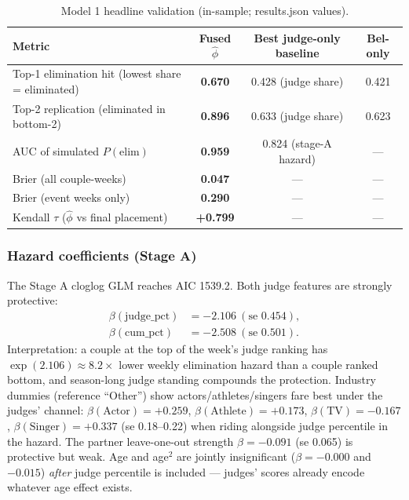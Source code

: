 \documentclass[10pt]{article}
\begin{document}
\begin{table}[H]
\centering
\caption{Model 1 headline validation (in-sample; results.json values).}
\label{tab:m1headline}
\begin{tabular}{lccc}
\toprule
Metric & Fused $\hat\phi$ & Best judge-only baseline & Bel-only \\
\midrule
Top-1 elimination hit (lowest share = eliminated) & \textbf{0.670} & 0.428 (judge share) & 0.421 \\
Top-2 replication (eliminated in bottom-2)        & \textbf{0.896} & 0.633 (judge share) & 0.623 \\
AUC of simulated $P(\text{elim})$                 & \textbf{0.959} & 0.824 (stage-A hazard) & --- \\
Brier (all couple-weeks)                          & \textbf{0.047} & --- & --- \\
Brier (event weeks only)                          & \textbf{0.290} & --- & --- \\
Kendall $\tau$ ($\hat\phi$ vs final placement)    & \textbf{+0.799} & --- & --- \\
\bottomrule
\end{tabular}
\end{table}

\subsubsection{Hazard coefficients (Stage A)}

The Stage A cloglog GLM reaches AIC 1539.2. Both judge features are strongly protective:
\begin{align}
\beta(\mathrm{judge\_pct}) &= -2.106 \ (\text{se } 0.454), \\
\beta(\mathrm{cum\_pct})   &= -2.508 \ (\text{se } 0.501).
\end{align}
Interpretation: a couple at the top of the week's judge ranking has
$\exp(2.106) \approx 8.2\times$ lower weekly elimination hazard than a couple ranked
bottom, and season-long judge standing compounds the protection. Industry dummies
(reference ``Other'') show actors/athletes/singers fare best under the judges' channel:
$\beta(\text{Actor}) = +0.259$, $\beta(\text{Athlete}) = +0.173$,
$\beta(\text{TV}) = -0.167$, $\beta(\text{Singer}) = +0.337$ (se 0.18--0.22) when riding
alongside judge percentile in the hazard. The partner leave-one-out strength
$\beta = -0.091$ (se 0.065) is protective but weak. Age and age$^2$ are jointly
insignificant ($\beta = -0.000$ and $-0.015$) \emph{after} judge percentile is included
--- judges' scores already encode whatever age effect exists.
\end{document}
